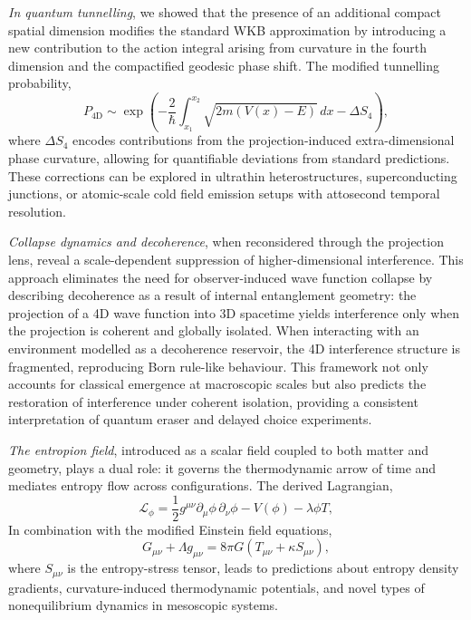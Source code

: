 \documentclass[12pt]{article}
\begin{document}
\emph{In quantum tunnelling}, we showed that the presence of an additional compact spatial dimension modifies the standard WKB approximation by introducing a new contribution to the action integral arising from curvature in the fourth dimension and the compactified geodesic phase shift. The modified tunnelling probability,
\begin{equation}
P_{\text{4D}} \sim \exp\left( -\frac{2}{\hbar} \int_{x_1}^{x_2} \sqrt{2m(V(x) - E)} \, dx - \Delta S_4 \right),
\end{equation}
where \(\Delta S_4\) encodes contributions from the projection-induced extra-dimensional phase curvature, allowing for quantifiable deviations from standard predictions. These corrections can be explored in ultrathin heterostructures, superconducting junctions, or atomic-scale cold field emission setups with attosecond temporal resolution.

\emph{Collapse dynamics and decoherence}, when reconsidered through the projection lens, reveal a scale-dependent suppression of higher-dimensional interference. This approach eliminates the need for observer-induced wave function collapse by describing decoherence as a result of internal entanglement geometry: the projection of a 4D wave function into 3D spacetime yields interference only when the projection is coherent and globally isolated. When interacting with an environment modelled as a decoherence reservoir, the 4D interference structure is fragmented, reproducing Born rule-like behaviour. This framework not only accounts for classical emergence at macroscopic scales but also predicts the restoration of interference under coherent isolation, providing a consistent interpretation of quantum eraser and delayed choice experiments.

\emph{The entropion field}, introduced as a scalar field coupled to both matter and geometry, plays a dual role: it governs the thermodynamic arrow of time and mediates entropy flow across configurations. The derived Lagrangian,
\begin{equation}
\mathcal{L}_\phi = \frac{1}{2} g^{\mu\nu} \partial_\mu \phi \, \partial_\nu \phi - V(\phi) - \lambda \phi T,
\end{equation}
In combination with the modified Einstein field equations,
\begin{equation}
G_{\mu\nu} + \Lambda g_{\mu\nu} = 8\pi G \left( T_{\mu\nu} + \kappa S_{\mu\nu} \right),
\end{equation}
where \(S_{\mu\nu}\) is the entropy-stress tensor, leads to predictions about entropy density gradients, curvature-induced thermodynamic potentials, and novel types of nonequilibrium dynamics in mesoscopic systems.
\end{document}
